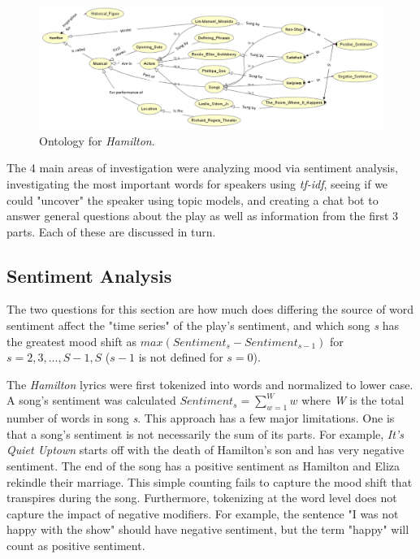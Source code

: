 \documentclass{article}
\begin{document}
\begin{figure}[h]
    \caption{Ontology for \emph{Hamilton}. \label{fig:ontology}}
    \centering
    \includegraphics[width=0.7\paperwidth, scale=1.25]{ontology.png}
\end{figure}

The 4 main areas of investigation were analyzing mood via sentiment analysis, investigating the most important words for speakers using \emph{tf-idf}, seeing if we could "uncover" the speaker using topic models, and creating a chat bot to answer general questions about the play as well as information from the first 3 parts. Each of these are discussed in turn.

\subsection{Sentiment Analysis}

The two questions for this section are how much does differing the source of word sentiment affect the "time series" of the play's sentiment, and which song \emph{s} has the greatest mood shift as $max(Sentiment_{s} - Sentiment_{s - 1})$ for $s = 2, 3, ..., S - 1, S$ ($s - 1$ is not defined for $s = 0$).

The \emph{Hamilton} lyrics were first tokenized into words and normalized to lower case. A song's sentiment was calculated $Sentiment_{s} = \sum_{w = 1}^{W}w$ where \emph{W} is the total number of words in song \emph{s}. This approach has a few major limitations. One is that a song's sentiment is not necessarily the sum of its parts. For example, \emph{It's Quiet Uptown} starts off with the death of Hamilton's son and has very negative sentiment. The end of the song has a positive sentiment as Hamilton and Eliza rekindle their marriage. This simple counting fails to capture the mood shift that transpires during the song. Furthermore, tokenizing at the word level does not capture the impact of negative modifiers. For example, the sentence "I was not happy with the show" should have negative sentiment, but the term "happy" will count as positive sentiment.
\end{document}
